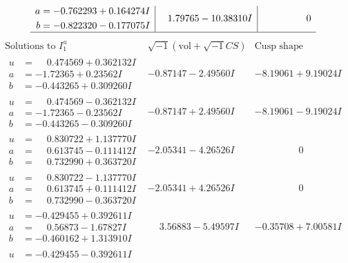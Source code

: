 \documentclass[1p]{elsarticle_modified}
\theoremstyle{definition}
\newcommand{\I}{\sqrt{-1}}
\begin{document}
$$\begin{array}{c|c|c}
\begin{aligned}
a &= -0.762293 + 0.164274 I \\
b &= -0.822320 - 0.177075 I\end{aligned}
 & \phantom{-}1.79765 - 10.38310 I & \phantom{-0.000000 } 0\\
 \hline 
 \end{array}$$\newpage$$\begin{array}{c|c|c}  
\text{Solutions to }I^u_{1}& \I (\text{vol} + \sqrt{-1}CS) & \text{Cusp shape}\\
 \hline 
\begin{aligned}
u &= \phantom{-}0.474569 + 0.362132 I \\
a &= -1.72365 + 0.23562 I \\
b &= -0.443265 + 0.309260 I\end{aligned}
 & -0.87147 - 2.49560 I & -8.19061 + 9.19024 I \\ \hline\begin{aligned}
u &= \phantom{-}0.474569 - 0.362132 I \\
a &= -1.72365 - 0.23562 I \\
b &= -0.443265 - 0.309260 I\end{aligned}
 & -0.87147 + 2.49560 I & -8.19061 - 9.19024 I \\ \hline\begin{aligned}
u &= \phantom{-}0.830722 + 1.137770 I \\
a &= \phantom{-}0.613745 - 0.111412 I \\
b &= \phantom{-}0.732990 + 0.363720 I\end{aligned}
 & -2.05341 - 4.26526 I & \phantom{-0.000000 } 0 \\ \hline\begin{aligned}
u &= \phantom{-}0.830722 - 1.137770 I \\
a &= \phantom{-}0.613745 + 0.111412 I \\
b &= \phantom{-}0.732990 - 0.363720 I\end{aligned}
 & -2.05341 + 4.26526 I & \phantom{-0.000000 } 0 \\ \hline\begin{aligned}
u &= -0.429455 + 0.392611 I \\
a &= \phantom{-}0.56873 - 1.67827 I \\
b &= -0.460162 + 1.313910 I\end{aligned}
 & \phantom{-}3.56883 - 5.49597 I & -0.35708 + 7.00581 I \\ \hline\begin{aligned}
u &= -0.429455 - 0.392611 I \\

\end{aligned}
\end{array}$$
\end{document}
